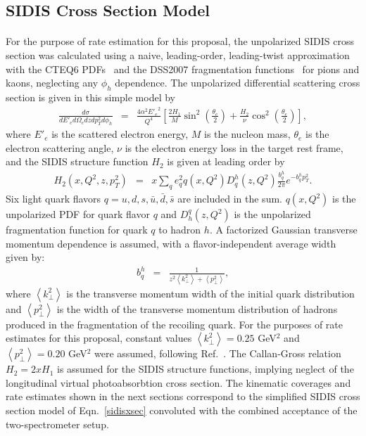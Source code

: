 \subsection{SIDIS Cross Section Model}
\paragraph{} For the purpose of rate estimation for this proposal, the unpolarized SIDIS cross section was calculated using a naive, leading-order, leading-twist approximation with the CTEQ6 PDFs~\cite{CTEQ6} and the DSS2007 fragmentation functions~\cite{DSS2007} for pions and kaons, neglecting any $\phi_h$ dependence. The unpolarized differential scattering cross section is given in this simple model by 
\begin{eqnarray}
  \frac{d\sigma}{dE'_e d\Omega_e dz dp_T^2 d\phi_h} &=& \frac{4\alpha^2 {E'_e}^2}{Q^4}\left[\frac{2H_1}{M} \sin^2 \left(\frac{\theta_e}{2}\right) + \frac{H_2}{\nu} \cos^2\left(\frac{\theta_e}{2}\right)\right], \label{sidisxsec}
\end{eqnarray}
where $E'_e$ is the scattered electron energy, $M$ is the nucleon mass, $\theta_e$ is the electron scattering angle, $\nu$ is the electron energy loss in the target rest frame, and the SIDIS structure function $H_2$ is given at leading order by
\begin{eqnarray}
  H_2(x, Q^2, z, p_T^2) &=& x \sum_q e_q^2 q(x,Q^2) D^h_q(z,Q^2) \frac{b_q^h}{2\pi}e^{-b_q^h p_T^2}.
\end{eqnarray}
Six light quark flavors $q = u,d,s, \bar{u}, \bar{d}, \bar{s}$ are included in the sum. $q(x,Q^2)$ is the unpolarized PDF for quark flavor $q$ and $D_h^q(z,Q^2)$ is the unpolarized fragmentation function for quark $q$ to hadron $h$. A factorized Gaussian transverse momentum dependence is assumed, with a flavor-independent average width given by:
\begin{eqnarray}
  b_q^h &=& \frac{1}{z^2\left<k^2_\perp\right> + \left<p_\perp^2 \right>}, 
\end{eqnarray}
where $\left<k^2_\perp\right>$ is the transverse momentum width of the initial quark distribution and $ \left<p_\perp^2 \right>$ is the width of the transverse momentum distribution of hadrons produced in the fragmentation of the recoiling quark. For the purposes of rate estimates for this proposal, constant values $\left<k^2_\perp\right> = 0.25$ GeV$^2$ and  $ \left<p_\perp^2 \right> = 0.20$ GeV$^2$ were assumed, following Ref.~\cite{PhysRevD.71.074006}. The Callan-Gross relation $H_2 = 2xH_1$ is assumed for the SIDIS structure functions, implying neglect of the longitudinal virtual photoabsorbtion cross section. The kinematic coverages and rate estimates shown in the next sections correspond to the simplified SIDIS cross section model of Eqn.~\eqref{sidisxsec} convoluted with the combined acceptance of the two-spectrometer setup.

